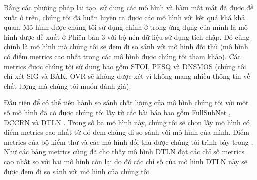 	Bằng các phương pháp lai tạo, sử dụng các mô hình và hàm mất mát đã được đề xuất ở trên, chúng tôi đã huấn luyện ra được các mô hình với kết quả khá khả quan. Mô hình được chúng tôi sử dụng chính ở trong ứng dụng của mình là mô hình được đề xuất ở Phiên bản 3 với bộ nén dữ liệu sử dụng tích chập. Đó cũng chính là mô hình mà chúng tôi sẽ đem đi so sánh với mô hình đối thủ (mô hình có điểm metrics cao nhất trong các mô hình được chúng tôi tham khảo). Các metrics được chúng tôi sử dụng bao gồm STOI, PESQ và DNSMOS (chúng tôi chỉ xét SIG và BAK, OVR sẽ không được xét vì không mang nhiều thông tin về chất lượng mà chúng tôi muốn đánh giá).
	
	Đầu tiên để có thể tiến hành so sánh chất lượng của mô hình chúng tôi với một số mô hình đã có được chúng tôi lấy từ các bài báo bao gồm FullSubNet \cite{fullsubnet}, DCCRN \cite{dccrn} và DTLN \cite{dtln}. Trong số ba mô hình này, chúng tôi sẽ chọn lấy mô hình có điểm metrics cao nhất từ đó đem chúng đi so sánh với mô hình của mình. Điểm metrics của bộ kiểm thử và các mô hình đối thủ được chúng tôi trình bày trong . Như các bảng metrics cũng đã cho thấy mô hình DTLN đạt các chỉ số metrics cao nhất so với hai mô hình còn lại do đó các chỉ số của mô hình DTLN này sẽ được đem đi so sánh với mô hình của chúng tôi.
	
